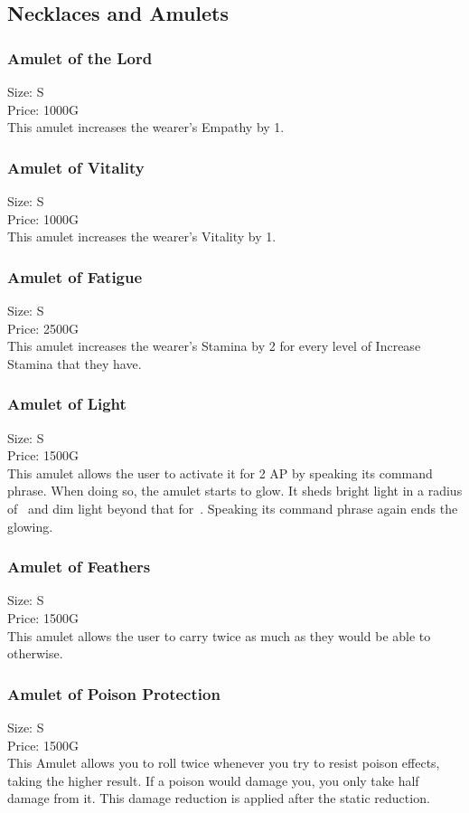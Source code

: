 \subsection{Necklaces and Amulets}\label{subsec:amulets}

\subsubsection{Amulet of the Lord}\label{item:amuletOfLord}
Size: S\\
Price: 1000G\\
This amulet increases the wearer's Empathy by 1.

\subsubsection{Amulet of Vitality}\label{item:amuletOfVitality}
Size: S\\
Price: 1000G\\
This amulet increases the wearer's Vitality by 1.

\subsubsection{Amulet of Fatigue}\label{item:amuletOfFatigue}
Size: S\\
Price: 2500G\\
This amulet increases the wearer's Stamina by 2 for every level of Increase Stamina that they have.

\subsubsection{Amulet of Light}\label{item:amuletOfLight}
Size: S\\
Price: 1500G\\
This amulet allows the user to activate it for 2 AP by speaking its command phrase.
When doing so, the amulet starts to glow.
It sheds bright light in a radius of~ and dim light beyond that for~.
Speaking its command phrase again ends the glowing.

\subsubsection{Amulet of Feathers}\label{item:amuletOfFeathers}
Size: S\\
Price: 1500G\\
This amulet allows the user to carry twice as much as they would be able to otherwise.

\subsubsection{Amulet of Poison Protection}\label{item:amuletOfAntidote}
Size: S\\
Price: 1500G\\
This Amulet allows you to roll twice whenever you try to resist poison effects, taking the higher result.
If a poison would damage you, you only take half damage from it.
This damage reduction is applied after the static reduction.